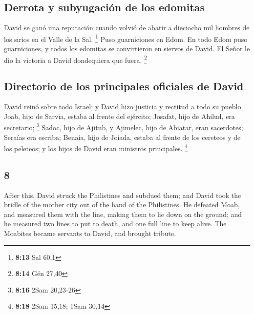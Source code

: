 \begin{paracol}{2}
\hypertarget{derrota-y-subyugaciuxf3n-de-los-edomitas}{%
\subsection{Derrota y subyugación de los
edomitas}\label{derrota-y-subyugaciuxf3n-de-los-edomitas}}

 David se ganó una reputación cuando volvió de abatir a
dieciocho mil hombres de los sirios en el Valle de la Sal. \footnote{\textbf{8:13}
  Sal 60,1}  Puso guarniciones en Edom. En todo Edom puso
guarniciones, y todos los edomitas se convirtieron en siervos de David.
El Señor le dio la victoria a David dondequiera que fuera. \footnote{\textbf{8:14}
  Gén 27,40}

\hypertarget{directorio-de-los-principales-oficiales-de-david}{%
\subsection{Directorio de los principales oficiales de
David}\label{directorio-de-los-principales-oficiales-de-david}}

 David reinó sobre todo Israel; y David hizo justicia y
rectitud a todo su pueblo.  Joab, hijo de Sarvia, estaba
al frente del ejército; Josafat, hijo de Ahilud, era secretario;
\footnote{\textbf{8:16} 2Sam 20,23-26}  Sadoc, hijo de
Ajitub, y Ajimelec, hijo de Abiatar, eran sacerdotes; Seraías era
escriba;  Benaía, hijo de Joiada, estaba al frente de los
cereteos y de los peleteos; y los hijos de David eran ministros
principales. \footnote{\textbf{8:18} 2Sam 15,18; 1Sam 30,14}

\switchcolumn
\begin{otherlanguage}{english}

\hypertarget{section-15}{%
\section{8}\label{section-15}}

 After this, David struck the Philistines and subdued
them; and David took the bridle of the mother city out of the hand of
the Philistines.  He defeated Moab, and measured them with
the line, making them to lie down on the ground; and he measured two
lines to put to death, and one full line to keep alive. The Moabites
became servants to David, and brought tribute.


\end{otherlanguage}
\end{paracol}
